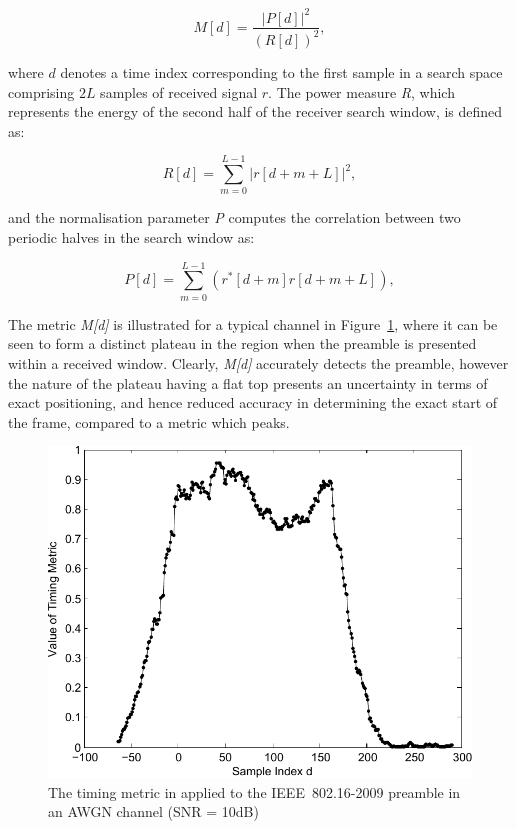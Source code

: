 \begin{center}
\begin{equation}
\label{MMetric}
M[d] = \frac{|P[d]|^2} {(R[d])^2},
\end{equation}
\end{center}

where $d$ denotes a time index corresponding to the first sample in a search space comprising $2L$ samples of received signal $r$. The power measure \emph{R}, which represents the energy of the second half of the receiver search window, is defined as:

\begin{center}
\begin{equation}
\label{RMetric}
R[d] =\sum_{m =0}^{L-1}   |r[d+m+L]|^2,
\end{equation}
\end{center}

and the normalisation parameter \emph{P} computes the correlation between two periodic halves in the search window as:

\begin{center}
\begin{equation}
\label{PMetric}
P[d] =\sum_{m =0}^{L-1}    (r^{*}[d+m] r[d+m+L] ),
\end{equation}
\end{center}


The metric \emph{M[d]} is illustrated for a typical channel in Figure~\ref{fig:M1-10dB}, where it can be seen to form a distinct plateau in the region when the preamble is presented within a received window.
Clearly, \emph{M[d]} accurately detects the preamble, however the nature of the plateau having a flat top presents an uncertainty in terms of exact positioning, and hence reduced accuracy in determining the exact start of the frame, compared to a metric which peaks.

\begin{figure}
	\centerline{\includegraphics [width=0.8\columnwidth] {figures/M1_10dB.pdf} }
	\caption{The timing metric in \cite{Schmidl1997} applied to the IEEE~802.16-2009 preamble in an AWGN channel (SNR = 10dB)}
	\label{fig:M1-10dB}
\end{figure}

